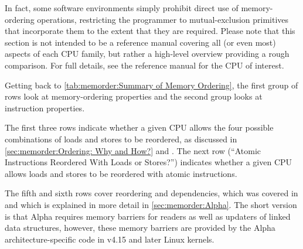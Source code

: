 \begin{table}[tb]
\vspace{5pt}\hfill
{}\OneColumnHSpace{-0.4in}
\caption{Summary of Memory Ordering}
\label{tab:memorder:Summary of Memory Ordering}
\end{table}

In fact, some software environments simply prohibit
direct use of memory-ordering operations, restricting the programmer
to mutual-exclusion primitives that incorporate them to the extent that
they are required.  Please note that this section is not intended to be
a reference manual
covering all (or even most) aspects of each CPU family, but rather
a high-level overview providing a rough comparison.
For full details, see the reference manual for the CPU of interest.

Getting back to
\cref{tab:memorder:Summary of Memory Ordering},
the first group of rows look at memory-ordering
properties and the second group looks at instruction properties.

The first three rows indicate whether a given CPU allows the four
possible combinations of loads and stores to be reordered, as discussed
in
\cref{sec:memorder:Ordering: Why and How?} and
.
The next row (``Atomic Instructions Reordered With Loads or Stores?'')
indicates whether a given CPU allows loads and stores
to be reordered with atomic instructions.

The fifth and sixth rows cover reordering and dependencies,
which was covered in
and which is explained in more detail in
\cref{sec:memorder:Alpha}.
The short version is that Alpha requires memory barriers for readers
as well as updaters of linked data structures, however, these memory
barriers are provided by the Alpha architecture-specific code in
v4.15 and later Linux kernels.

